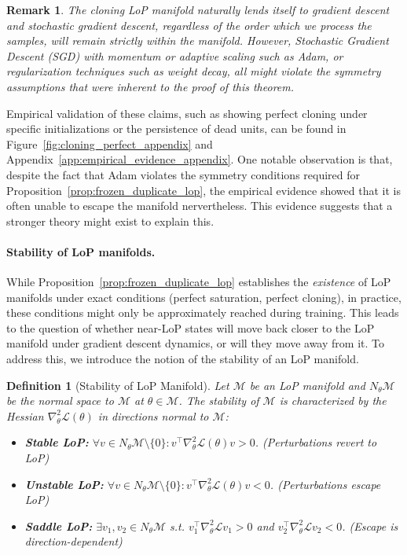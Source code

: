 \documentclass{article}
\newcommand{\Loss}{\mathcal{L}}
\newcommand{\GIU}[1]{\todo[color=purple!30,size=\tiny]{GIU: #1}}
\newtheorem{definition}{Definition}[section]
\newtheorem{remark}{Remark}[section]
\numberwithin{figure}{section}
\begin{document}
\begin{remark}
The cloning LoP manifold naturally lends itself to gradient descent and stochastic gradient descent, regardless of the order which we process the samples, will remain strictly within the manifold. However, Stochastic Gradient Descent (SGD) with momentum or adaptive scaling such as Adam, or regularization techniques such as weight decay, all might violate the symmetry assumptions that were inherent to the proof of this theorem.
\end{remark}

Empirical validation of these claims, such as showing perfect cloning under specific initializations  or the persistence of dead units, can be found in Figure~\ref{fig:cloning_perfect_appendix} and Appendix~\ref{app:empirical_evidence_appendix}. One notable observation is that, despite the fact that Adam violates the symmetry conditions required for Proposition~\ref{prop:frozen_duplicate_lop}, the empirical evidence showed that it is often unable to escape the manifold nervertheless. This evidence suggests that a stronger theory might exist to explain this.


\paragraph{Stability of LoP manifolds.}
While Proposition~\ref{prop:frozen_duplicate_lop} establishes the \emph{existence} of LoP manifolds under exact conditions (perfect saturation, perfect cloning), in practice, these conditions might only be approximately reached during training. This leads to the question of whether  near-LoP states will move back closer to the LoP manifold under gradient descent dynamics, or will they move away from it. To address this, we introduce the notion of the stability of an LoP manifold.

\begin{definition}[Stability of LoP Manifold]
\label{def:lop_stability_main}
Let $\mathcal{M}$ be an LoP manifold and $N_\theta\mathcal{M}$ be the normal space to $\mathcal{M}$ at $\theta \in \mathcal{M}$. The stability of $\mathcal{M}$ is characterized by the Hessian $\nabla_\theta^2\Loss(\theta)$ in directions normal to $\mathcal{M}$:
\begin{itemize}
    \item \textbf{Stable LoP:} $\forall v\in N_\theta\mathcal{M}\setminus\{0\}: v^\top\nabla_\theta^2\Loss(\theta)v > 0$. (Perturbations revert to LoP)
    \item \textbf{Unstable LoP:} $\forall v\in N_\theta\mathcal{M}\setminus\{0\}: v^\top\nabla_\theta^2\Loss(\theta)v < 0$. (Perturbations  escape LoP)
    \item \textbf{Saddle LoP:} $\exists v_1,v_2\in N_\theta\mathcal{M}$ s.t. $v_1^\top\nabla_\theta^2\Loss v_1>0$ and $v_2^\top\nabla_\theta^2\Loss v_2<0$. (Escape is direction-dependent)
\end{itemize}
\end{definition}
\end{document}
